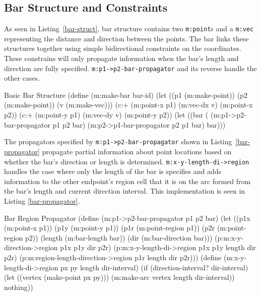\subsection{Bar Structure and Constraints}

As seen in Listing~\ref{bar-struct}, bar structure contains two
\texttt{m:point}s and a \texttt{m:vec} representing the distance and
direction between the points. The bar links these structures together
using simple bidirectional constraints on the coordinates. These
constrains will only propagate information when the bar's length and
direction are fully specified. \texttt{m:p1->p2-bar-propagator} and
its reverse handle the other cases.

\begin{code-listing}
[label=bar-struct]
{Basic Bar Structure}
(define (m:make-bar bar-id)
  (let ((p1 (m:make-point))
        (p2 (m:make-point))
        (v (m:make-vec)))
    (c:+ (m:point-x p1) (m:vec-dx v)
         (m:point-x p2))
    (c:+ (m:point-y p1) (m:vec-dy v)
         (m:point-y p2))
    (let ((bar (%
      (m:p1->p2-bar-propagator p1 p2 bar)
      (m:p2->p1-bar-propagator p2 p1 bar)
      bar)))
\end{code-listing}

The propagators specified by \texttt{m:p1->p2-bar-propagator} shown in
Listing~\ref{bar-propagator} propagate partial information about point
locations based on whether the bar's direction or length is
determined. \texttt{m:x-y-length-di->region} handles the case where
only the length of the bar is specifies and adds information to the
other endpoint's region cell that it is on the arc formed from the
bar's length and current direction interval. This implementation is
seen in Listing \ref{bar-propagator}.

\begin{code-listing}
[label=bar-propagator]
{Bar Region Propagator}
(define (m:p1->p2-bar-propagator p1 p2 bar)
  (let ((p1x (m:point-x p1))
        (p1y (m:point-y p1))
        (p1r (m:point-region p1))
        (p2r (m:point-region p2))
        (length (m:bar-length bar))
        (dir (m:bar-direction bar)))
    (p:m:x-y-direction->region p1x p1y dir p2r)
    (p:m:x-y-length-di->region p1x p1y length dir p2r)
    (p:m:region-length-direction->region p1r length dir p2r)))
(define (m:x-y-length-di->region px py length dir-interval)
  (if (direction-interval? dir-interval)
      (let ((vertex (make-point px py)))
        (m:make-arc vertex length dir-interval))
      nothing))
\end{code-listing}
\vspace{-1em}
